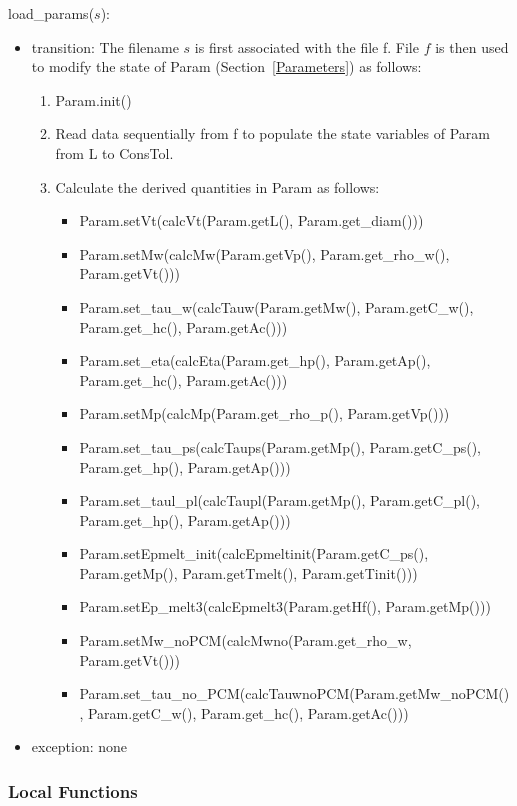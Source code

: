 \documentclass[12pt]{article}
\begin{document}
load\_params($s$): \\
\begin{itemize}
\item transition: The filename $s$ is first associated with the file f.
  File $f$ is then used to modify the state of Param (Section~\ref{Parameters}) as
  follows:
\begin{enumerate}
\item Param.init()
\item Read data sequentially from f to populate the state variables of
  Param from L to ConsTol.
\item Calculate the derived quantities in Param as follows:
\begin{itemize}
\item Param.setVt(calcVt(Param.getL(), Param.get\_diam()))
\item Param.setMw(calcMw(Param.getVp(), Param.get\_rho\_w(), Param.getVt()))
\item Param.set\_tau\_w(calcTauw(Param.getMw(), Param.getC\_w(), Param.get\_hc(), Param.getAc()))
\item Param.set\_eta(calcEta(Param.get\_hp(), Param.getAp(), Param.get\_hc(), Param.getAc()))
\item Param.setMp(calcMp(Param.get\_rho\_p(), Param.getVp()))
\item Param.set\_tau\_ps(calcTaups(Param.getMp(), Param.getC\_ps(),
  Param.get\_hp(), Param.getAp()))
\item Param.set\_taul\_pl(calcTaupl(Param.getMp(), Param.getC\_pl(),
  Param.get\_hp(), Param.getAp()))
\item Param.setEpmelt\_init(calcEpmeltinit(Param.getC\_ps(), Param.getMp(),
  Param.getTmelt(), Param.getTinit()))
\item Param.setEp\_melt3(calcEpmelt3(Param.getHf(), Param.getMp()))
\item Param.setMw\_noPCM(calcMwno(Param.get\_rho\_w, Param.getVt()))
\item Param.set\_tau\_no\_PCM(calcTauwnoPCM(Param.getMw\_noPCM(),
  Param.getC\_w(), Param.get\_hc(), Param.getAc()))
\end{itemize}
\end{enumerate}

\item exception: none
\end{itemize}

\subsubsection{Local Functions}
\end{document}

